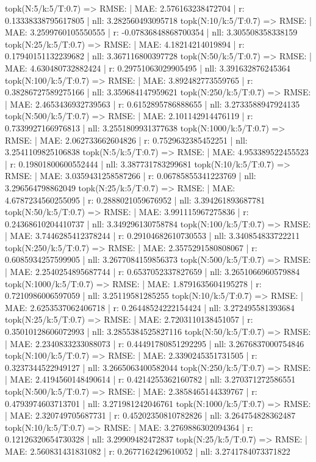 topk(N:5/k:5/T:0.7) => RMSE: | MAE: 2.576163238472704 | r: 0.13338338795617805 | nll: 3.282560493095718
topk(N:10/k:5/T:0.7) => RMSE: | MAE: 3.2599760105550555 | r: -0.07836848868700354 | nll: 3.305508358338159
topk(N:25/k:5/T:0.7) => RMSE: | MAE: 4.18214214019894 | r: 0.17940151132239682 | nll: 3.367116800397728
topk(N:50/k:5/T:0.7) => RMSE: | MAE: 4.630480732882424 | r: 0.29751063029905495 | nll: 3.391632876245364
topk(N:100/k:5/T:0.7) => RMSE: | MAE: 3.892482773559765 | r: 0.38286727589275166 | nll: 3.359684147959621
topk(N:250/k:5/T:0.7) => RMSE: | MAE: 2.4653436932739563 | r: 0.6152895786888655 | nll: 3.2733588947924135
topk(N:500/k:5/T:0.7) => RMSE: | MAE: 2.101142914476119 | r: 0.7339927166976813 | nll: 3.2551809931377638
topk(N:1000/k:5/T:0.7) => RMSE: | MAE: 2.062733662604826 | r: 0.7529632385452251 | nll: 3.2541109825106838
topk(N:5/k:5/T:0.7) => RMSE: | MAE: 4.953389522455523 | r: 0.19801800600552444 | nll: 3.387731783299681
topk(N:10/k:5/T:0.7) => RMSE: | MAE: 3.0359431258587266 | r: 0.06785855341223769 | nll: 3.296564798862049
topk(N:25/k:5/T:0.7) => RMSE: | MAE: 4.6787234560255095 | r: 0.2888021059676952 | nll: 3.394261893687781
topk(N:50/k:5/T:0.7) => RMSE: | MAE: 3.991115967275836 | r: 0.24368610204410737 | nll: 3.349296130758784
topk(N:100/k:5/T:0.7) => RMSE: | MAE: 3.7446285412378244 | r: 0.29104682610730553 | nll: 3.340854833722211
topk(N:250/k:5/T:0.7) => RMSE: | MAE: 2.3575291580808067 | r: 0.6085934257599905 | nll: 3.2677084159856373
topk(N:500/k:5/T:0.7) => RMSE: | MAE: 2.2540254895687744 | r: 0.6537052337827659 | nll: 3.2651066960579884
topk(N:1000/k:5/T:0.7) => RMSE: | MAE: 1.8791635604195278 | r: 0.7210986006597059 | nll: 3.25119581285255
topk(N:10/k:5/T:0.7) => RMSE: | MAE: 2.6253537062406718 | r: 0.26448524222154424 | nll: 3.272495581393684
topk(N:25/k:5/T:0.7) => RMSE: | MAE: 2.7203110138451057 | r: 0.35010128606072993 | nll: 3.2855384525827116
topk(N:50/k:5/T:0.7) => RMSE: | MAE: 2.2340833233088073 | r: 0.44491780851292295 | nll: 3.2676837000754846
topk(N:100/k:5/T:0.7) => RMSE: | MAE: 2.3390245351731505 | r: 0.3237344522949127 | nll: 3.2665063400582044
topk(N:250/k:5/T:0.7) => RMSE: | MAE: 2.4194560148490614 | r: 0.4214255362160782 | nll: 3.270371272586551
topk(N:500/k:5/T:0.7) => RMSE: | MAE: 2.3858465144339767 | r: 0.4793974603713701 | nll: 3.271981242046761
topk(N:1000/k:5/T:0.7) => RMSE: | MAE: 2.320749705687731 | r: 0.45202350810782826 | nll: 3.264754828362487
topk(N:10/k:5/T:0.7) => RMSE: | MAE: 3.2769886302094364 | r: 0.12126320654730328 | nll: 3.29909482472837
topk(N:25/k:5/T:0.7) => RMSE: | MAE: 2.560831431831082 | r: 0.2677162429610052 | nll: 3.2741784073371822
